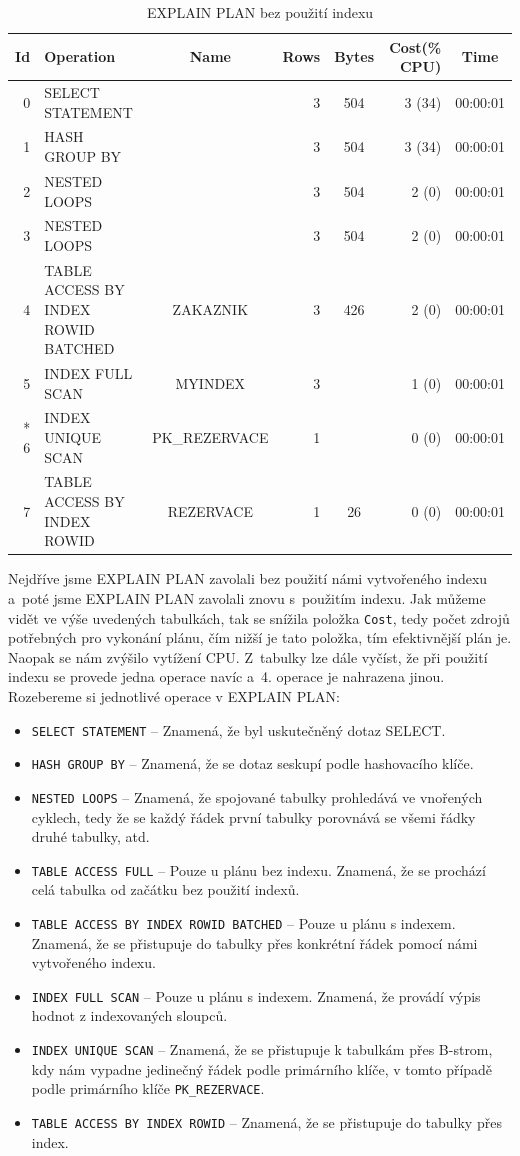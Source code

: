 \documentclass[a4paper, 12pt]{article}
\begin{document}
\begin{table}[h]
\footnotesize
\begin{tabular}{| r | l | c | r | c | r | c |}
\hline
Id & Operation & Name & Rows & Bytes & Cost(\% CPU) & Time\\
\hline
0 & SELECT STATEMENT &  & 3 & 504 & 3 (34) & 00:00:01\\
\hline
1 & HASH GROUP BY &  & 3 & 504 & 3 (34) & 00:00:01\\
\hline
2 & NESTED LOOPS & & 3 & 504 & 2 (0) & 00:00:01\\
\hline
3 & NESTED LOOPS & & 3 & 504 & 2 (0) & 00:00:01\\
\hline
4 & TABLE ACCESS BY INDEX ROWID BATCHED & ZAKAZNIK & 3 & 426 & 2 (0) & 00:00:01\\
\hline
5 & INDEX FULL SCAN & MYINDEX & 3 & & 1 (0) & 00:00:01\\
\hline
* 6 & INDEX UNIQUE SCAN & PK\_REZERVACE & 1 & & 0 (0) & 00:00:01\\
\hline
7 & TABLE ACCESS BY INDEX ROWID & REZERVACE & 1 & 26 & 0 (0) & 00:00:01\\
\hline

\end{tabular}
\caption{EXPLAIN PLAN bez použití indexu}
\end{table}
Nejdříve jsme EXPLAIN PLAN zavolali bez použití námi vytvořeného indexu a~poté jsme EXPLAIN PLAN zavolali znovu s~použitím indexu. Jak můžeme vidět ve výše uvedených tabulkách, tak se snížila položka \texttt{Cost}, tedy počet zdrojů potřebných pro vykonání plánu, čím nižší je tato položka, tím efektivnější plán je. Naopak se nám zvýšilo vytížení CPU. Z~tabulky lze dále vyčíst, že při použití indexu se provede jedna operace navíc a~4. operace je nahrazena jinou. Rozebereme si jednotlivé operace v EXPLAIN PLAN:
\begin{itemize}
\item \texttt{SELECT STATEMENT} -- Znamená, že byl uskutečněný dotaz SELECT.
\item \texttt{HASH GROUP BY} -- Znamená, že se dotaz seskupí podle hashovacího klíče.
\item \texttt{NESTED LOOPS} -- Znamená, že spojované tabulky prohledává ve vnořených cyklech, tedy že se každý řádek první tabulky porovnává se všemi řádky druhé tabulky, atd.
\item \texttt{TABLE ACCESS FULL} -- Pouze u plánu bez indexu. Znamená, že se prochází celá tabulka od začátku bez použití indexů.
\item \texttt{TABLE ACCESS BY INDEX ROWID BATCHED} -- Pouze u plánu s indexem. Znamená, že se přistupuje do tabulky přes konkrétní řádek pomocí námi vytvořeného indexu.
\item \texttt{INDEX FULL SCAN} -- Pouze u plánu s indexem. Znamená, že provádí výpis hodnot z indexovaných sloupců.
\item \texttt{INDEX UNIQUE SCAN} -- Znamená, že se přistupuje k tabulkám přes B-strom, kdy nám vypadne jedinečný řádek podle primárního klíče, v tomto případě podle primárního klíče \texttt{PK\_REZERVACE}.
\item \texttt{TABLE ACCESS BY INDEX ROWID} -- Znamená, že se přistupuje do tabulky přes index.  
\end{itemize} 
\end{document}
